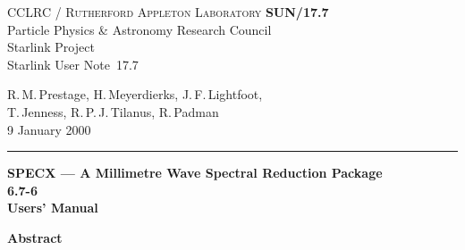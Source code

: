 \documentclass[twoside,11pt]{article}
\newcommand{\stardoccategory}  {Starlink User Note}
\newcommand{\stardocinitials}  {SUN}
\newcommand{\stardocnumber}    {17.7}
\newcommand{\stardocauthors}   {R.\,M.\,Prestage, H.\,Meyerdierks,
J.\,F.\,Lightfoot, \\ T.\,Jenness, R.\,P.\,J.\,Tilanus, R.\,Padman}
\newcommand{\stardocdate}      {9 January 2000}
\newcommand{\stardoctitle}     {SPECX --- A Millimetre Wave Spectral Reduction 
Package}
\newcommand{\stardocversion}   {6.7-6}
\newcommand{\stardocmanual}    {Users' Manual}
\newcommand{\stardocname}{\stardocinitials /\stardocnumber}
\newenvironment{latexonly}{}{}
\renewcommand{\_}{\texttt{\symbol{95}}}
\begin{document}
\thispagestyle{empty}

\begin{latexonly}
   CCLRC / \textsc{Rutherford Appleton Laboratory} \hfill \textbf{\stardocname}\\
   {\large Particle Physics \& Astronomy Research Council}\\
   {\large Starlink Project\\}
   {\large \stardoccategory\ \stardocnumber}
   \begin{flushright}
   \stardocauthors\\
   \stardocdate
   \end{flushright}
   \vspace{-4mm}
   \rule{\textwidth}{0.5mm}
   \vspace{5mm}
   \begin{center}
   {\Huge\textbf{\stardoctitle \\ [2.5ex]}}
   {\LARGE\textbf{\stardocversion \\ [4ex]}}
   {\Huge\textbf{\stardocmanual}}
   \end{center}
   \vspace{5mm}


   \vspace{10mm}
   \begin{center}
      {\Large\textbf{Abstract}}
   \end{center}
\end{latexonly}
\end{document}
